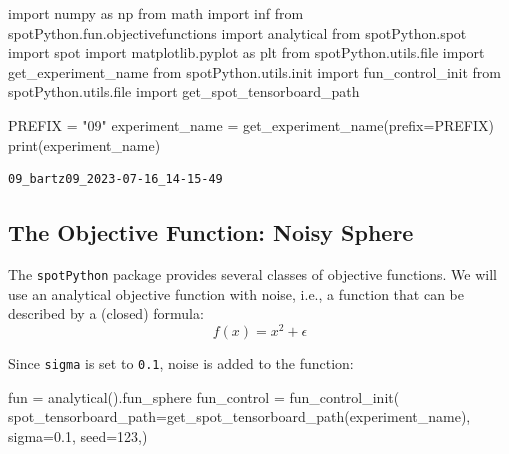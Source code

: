\documentclass[
  letterpaper,
  DIV=11,
  numbers=noendperiod]{scrreprt}
\newenvironment{Shaded}{\begin{snugshade}}{\end{snugshade}}
\newcommand{\BuiltInTok}[1]{\textcolor[rgb]{0.00,0.23,0.31}{#1}}
\newcommand{\DecValTok}[1]{\textcolor[rgb]{0.68,0.00,0.00}{#1}}
\newcommand{\FloatTok}[1]{\textcolor[rgb]{0.68,0.00,0.00}{#1}}
\newcommand{\ImportTok}[1]{\textcolor[rgb]{0.00,0.46,0.62}{#1}}
\newcommand{\NormalTok}[1]{\textcolor[rgb]{0.00,0.23,0.31}{#1}}
\newcommand{\OperatorTok}[1]{\textcolor[rgb]{0.37,0.37,0.37}{#1}}
\newcommand{\StringTok}[1]{\textcolor[rgb]{0.13,0.47,0.30}{#1}}
\begin{document}
\begin{Shaded}
\begin{Highlighting}[]
\ImportTok{import}\NormalTok{ numpy }\ImportTok{as}\NormalTok{ np}
\ImportTok{from}\NormalTok{ math }\ImportTok{import}\NormalTok{ inf}
\ImportTok{from}\NormalTok{ spotPython.fun.objectivefunctions }\ImportTok{import}\NormalTok{ analytical}
\ImportTok{from}\NormalTok{ spotPython.spot }\ImportTok{import}\NormalTok{ spot}
\ImportTok{import}\NormalTok{ matplotlib.pyplot }\ImportTok{as}\NormalTok{ plt}
\ImportTok{from}\NormalTok{ spotPython.utils.}\BuiltInTok{file} \ImportTok{import}\NormalTok{ get\_experiment\_name}
\ImportTok{from}\NormalTok{ spotPython.utils.init }\ImportTok{import}\NormalTok{ fun\_control\_init}
\ImportTok{from}\NormalTok{ spotPython.utils.}\BuiltInTok{file} \ImportTok{import}\NormalTok{ get\_spot\_tensorboard\_path}

\NormalTok{PREFIX }\OperatorTok{=} \StringTok{"09"}
\NormalTok{experiment\_name }\OperatorTok{=}\NormalTok{ get\_experiment\_name(prefix}\OperatorTok{=}\NormalTok{PREFIX)}
\BuiltInTok{print}\NormalTok{(experiment\_name)}
\end{Highlighting}
\end{Shaded}

\begin{verbatim}
09_bartz09_2023-07-16_14-15-49
\end{verbatim}

\hypertarget{the-objective-function-noisy-sphere-1}{%
\subsection{The Objective Function: Noisy
Sphere}\label{the-objective-function-noisy-sphere-1}}

The \texttt{spotPython} package provides several classes of objective
functions. We will use an analytical objective function with noise,
i.e., a function that can be described by a (closed) formula:
\[f(x) = x^2 + \epsilon\]

Since \texttt{sigma} is set to \texttt{0.1}, noise is added to the
function:

\begin{Shaded}
\begin{Highlighting}[]
\NormalTok{fun }\OperatorTok{=}\NormalTok{ analytical().fun\_sphere}
\NormalTok{fun\_control }\OperatorTok{=}\NormalTok{ fun\_control\_init(}
\NormalTok{    spot\_tensorboard\_path}\OperatorTok{=}\NormalTok{get\_spot\_tensorboard\_path(experiment\_name),}
\NormalTok{    sigma}\OperatorTok{=}\FloatTok{0.1}\NormalTok{,}
\NormalTok{    seed}\OperatorTok{=}\DecValTok{123}\NormalTok{,)}
\end{Highlighting}
\end{Shaded}
\end{document}
